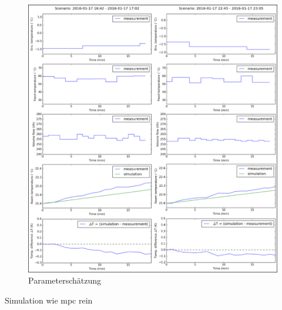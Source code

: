 \begin{figure}
\centering
\includegraphics[width=\textwidth]{abbildungen/20160329_pestep3}
\caption{Parameterschätzung}
\label{fig:step3}
\end{figure}




Simulation wie mpc rein

